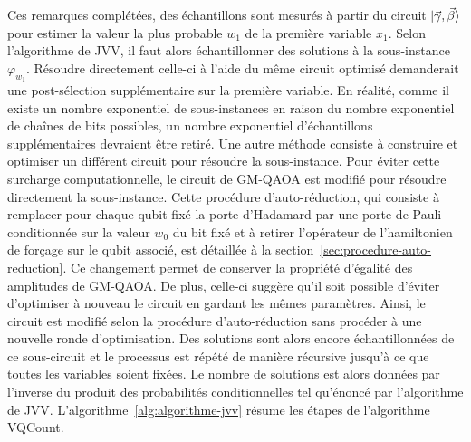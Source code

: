 Ces remarques complétées, des échantillons sont mesurés à partir du circuit $\ket{\vec{\gamma}, \vec{\beta}}$ pour estimer la valeur la plus probable $w_{1}$ de la première variable $x_{1}$. Selon l'algorithme de JVV, il faut alors échantillonner des solutions à la sous-instance $\varphi_{w_{1}}$. Résoudre directement celle-ci à l'aide du même circuit optimisé demanderait une post-sélection supplémentaire sur la première variable. En réalité, comme il existe un nombre exponentiel de sous-instances en raison du nombre exponentiel de chaînes de bits possibles, un nombre exponentiel d'échantillons supplémentaires devraient être retiré. Une autre méthode consiste à construire et optimiser un différent circuit pour résoudre la sous-instance. Pour éviter cette surcharge computationnelle, le circuit de GM-QAOA est modifié pour résoudre directement la sous-instance. Cette procédure d'auto-réduction, qui consiste à remplacer pour chaque qubit fixé la porte d'Hadamard par une porte de Pauli conditionnée sur la valeur $w_{0}$ du bit fixé et à retirer l'opérateur de l'hamiltonien de forçage sur le qubit associé, est détaillée à la section~\ref{sec:procedure-auto-reduction}.
Ce changement permet de conserver la propriété d'égalité des amplitudes de GM-QAOA. De plus, celle-ci suggère qu'il soit possible d'éviter d'optimiser à nouveau le circuit en gardant les mêmes paramètres. Ainsi, le circuit est modifié selon la procédure d'auto-réduction sans procéder à une nouvelle ronde d'optimisation. Des solutions sont alors encore échantillonnées de ce sous-circuit et le processus est répété de manière récursive jusqu'à ce que toutes les variables soient fixées. Le nombre de solutions est alors données par l'inverse du produit des probabilités conditionnelles tel qu'énoncé par l'algorithme de JVV. L'algorithme~\ref{alg:algorithme-jvv} résume les étapes de l'algorithme VQCount.

